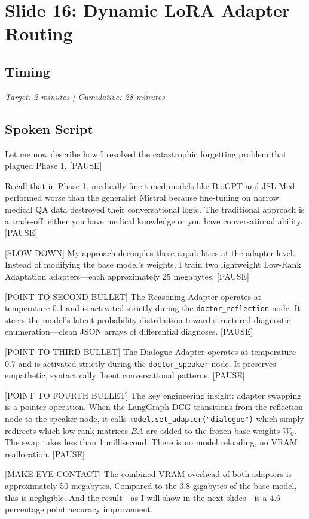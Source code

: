 \section{Slide 16: Dynamic LoRA Adapter Routing}

\subsection*{Timing}
\textit{Target: 2 minutes | Cumulative: 28 minutes}

\subsection*{Spoken Script}
\begin{spokenbox}
 Let me now describe how I resolved the catastrophic forgetting problem that plagued Phase 1. [PAUSE]

Recall that in Phase 1, medically fine-tuned models like BioGPT and JSL-Med performed worse than the generalist Mistral because fine-tuning on narrow medical QA data destroyed their conversational logic. The traditional approach is a trade-off: either you have medical knowledge or you have conversational ability. [PAUSE]

[SLOW DOWN] My approach decouples these capabilities at the adapter level. Instead of modifying the base model's weights, I train two lightweight Low-Rank Adaptation adapters---each approximately 25 megabytes. [PAUSE]

[POINT TO SECOND BULLET] The Reasoning Adapter operates at temperature 0.1 and is activated strictly during the \texttt{doctor\_reflection} node. It steers the model's latent probability distribution toward structured diagnostic enumeration---clean JSON arrays of differential diagnoses. [PAUSE]

[POINT TO THIRD BULLET] The Dialogue Adapter operates at temperature 0.7 and is activated strictly during the \texttt{doctor\_speaker} node. It preserves empathetic, syntactically fluent conversational patterns. [PAUSE]

[POINT TO FOURTH BULLET] The key engineering insight: adapter swapping is a pointer operation. When the LangGraph DCG transitions from the reflection node to the speaker node, it calls \texttt{model.set\_adapter("dialogue")} which simply redirects which low-rank matrices $BA$ are added to the frozen base weights $W_0$. The swap takes less than 1 millisecond. There is no model reloading, no VRAM reallocation. [PAUSE]

[MAKE EYE CONTACT] The combined VRAM overhead of both adapters is approximately 50 megabytes. Compared to the 3.8 gigabytes of the base model, this is negligible. And the result---as I will show in the next slides---is a 4.6 percentage point accuracy improvement.
\end{spokenbox}

